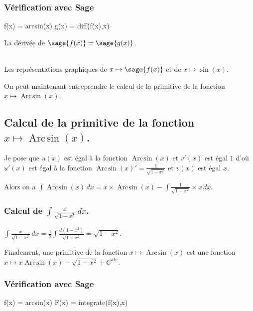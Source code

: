\documentclass[a4paper,12pt]{report}
\renewcommand{\arcsin}{\mathop{\mathrm{Arc\mspace{2mu}sin}}}
\begin{document}
\subsubsection{Vérification avec Sage}

\begin{sageblock}
    f(x) = arcsin(x)
    g(x) = diff(f(x),x)
\end{sageblock}

La dérivée de $\sage{f(x)} = \sage{g(x)} $.


\begin{center}
\\
Les représentations graphiques de $x \mapsto \sage{f(x)} $ et de $x\mapsto \sin(x)$.
\end{center}


On peut maintenant entreprendre le calcul de la primitive de la  fonction  $x \mapsto \arcsin(x) $.

\subsection{Calcul de la primitive de la fonction  $x \mapsto \arcsin(x) $.}


Je pose que $u(x)$  est égal à la fonction $\arcsin(x)$ et $v'(x)$ est égal $1$  d'où $u'(x)$  est égal à la fonction $\arcsin(x) ' = \frac{1}{\sqrt{1- x^2}} $ et $v(x)$ est égal $x$.

Alors on a $\int \arcsin(x) \, dx = x \times \arcsin(x) -\int \frac{1}{\sqrt{1- x^2}} \times x \, dx $.


\subsubsection{Calcul de $\int \frac{x}{\sqrt{1- x^2}} \, dx $.}

$\int \frac{x}{\sqrt{1- x^2}} \, dx = \frac{1}{2} \int \frac{d(1-x^2)}{\sqrt{1- x^2}}= \sqrt{1- x^2} $.


Finalement, une primitive de la fonction $x \mapsto \arcsin(x) $ est une fonction  $ x \mapsto x \arcsin(x) - \sqrt{1- x^2} + C^{ste} $.

\subsubsection{Vérification avec Sage}

\begin{sageblock}
    f(x) = arcsin(x)
    F(x) = integrate(f(x),x)
\end{sageblock}
\end{document}
